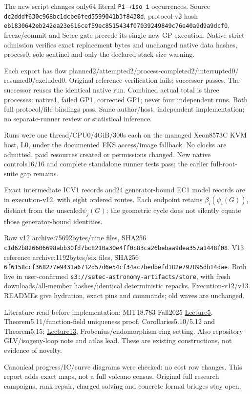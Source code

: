 \documentclass[
  10pt,
]{article}
\begin{document}
The new script changes only64 literal \texttt{Pi}→\texttt{iso\_i}
occurrences. Source \texttt{dc2dddf6\allowbreak{}30c968bc\allowbreak{}1dcbe6fe\allowbreak{}d5599041\allowbreak{}b3f8438d},
protocol-v2 hash
\texttt{eb183064\allowbreak{}2eb242ea\allowbreak{}23e616ce\allowbreak{}f59ec851\allowbreak{}5434f070\allowbreak{}39249849\allowbreak{}c76e40a9\allowbreak{}d9a9dcf0},
freeze/commit and Setec gate precede its single new GP execution. Native
strict admission verifies exact replacement bytes and unchanged native
data hashes, process0, sole sentinel and only the declared stack-size
warning.

Each export has flow
planned2/attempted2/process-completed2/interrupted0/ resumed0/excluded0.
Original reference verification fails; successor passes. The successor
reuses the identical native run. Combined actual total is three
processes: native1, failed GP1, corrected GP1; never four independent
runs. Both full protocol/file bindings pass. Same author/host,
independent implementation; no separate-runner review or statistical
inference.

Runs were one thread/CPU0/4GiB/300s each on the managed Xeon8573C KVM
host, L0, under the documented EKS access/image fallback. No clocks are
admitted, paid resources created or permissions changed. New native
controls16/16 and complete standalone runner tests pass; the earlier
full-root-suite gap remains.

Exact intermediate ICV1 records and24 generator-bound EC1 model records
are in execution-v12, with eight ordered routes. Each endpoint retains
\(\beta_i(\psi_i(G))\), distinct from the unscaled\(\psi_j(G)\); the
geometric cycle does not silently equate those generator-bound
identities.

Raw v12 archive:75692bytes/nine files, SHA256
\texttt{c1d62b82\allowbreak{}6606698a\allowbreak{}bb30fd7b\allowbreak{}c8210a30\allowbreak{}e4ff0c83\allowbreak{}ca26beba\allowbreak{}a9dea357\allowbreak{}a1448f08}.
V13 reference archive:1192bytes/six files, SHA256
\texttt{6f6158cc\allowbreak{}f368277e\allowbreak{}9431a671\allowbreak{}2d57d6e5\allowbreak{}4cf34ac7\allowbreak{}bedbefd1\allowbreak{}82e79789\allowbreak{}5db14dae}.
Both live in user-confirmed
\texttt{s3://setec-astronomy-artifacts/store}, with fresh
downloads/all-member hashes/identical deterministic repacks.
Execution-v12/v13 READMEs give hydration, exact pins and commands; old
waves are unchanged.

Literature read before implementation: MIT18.783 Fall2025
\href{https://math.mit.edu/classes/18.783/2025/LectureNotes5.pdf}{Lecture5},
Theorem5.11/function-field uniqueness proof, Corollaries5.10/5.12 and
Theorem5.15;
\href{https://math.mit.edu/classes/18.783/2025/LectureNotes13.pdf}{Lecture13},
Frobenius/endomorphism-ring setting. Also repository GLV/isogeny-loop
note and atlas lead. These are existing constructions, not evidence of
novelty.

Canonical progress/IC/curve diagrams were checked: no cost row changes.
This report adds exact maps, not a full volcano census. Original full
research campaigns, rank repair, charged solving and concrete formal
bridges stay open.
\end{document}
